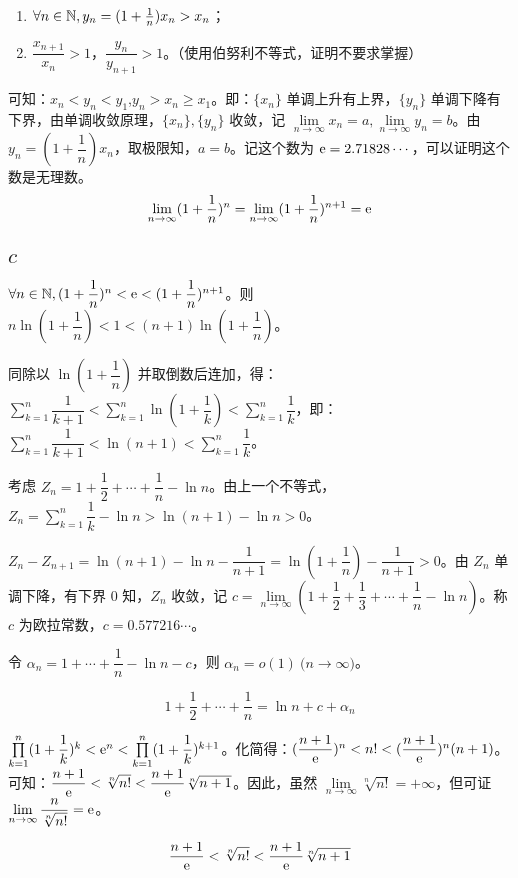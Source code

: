 \begin{enumerate}
	\item $\forall n \in \mathbb N, y_n = (1 + \frac{1}{n}) x_n > x_n$；
	\item $\dfrac{x_{n + 1}}{x_n} > 1$，$\dfrac{y_n}{y_{n + 1}} > 1$。（使用伯努利不等式，证明不要求掌握）
\end{enumerate}

可知：$x_n < y_n < y_1$,$y_n > x_n \ge x_1$。即：$\{x_n\}$ 单调上升有上界，$\{y_n\}$ 单调下降有下界，由单调收敛原理，$\{x_n\}, \{y_n\}$ 收敛，记 $\lim\limits_{n \rightarrow \infty} x_n = a, \lim\limits_{n \rightarrow \infty} y_n = b$。由 $y_n = (1 + \dfrac{1}{n}) x_n$，取极限知，$a = b$。记这个数为 $\mathrm e = 2.71828\cdots$，可以证明这个数是无理数。
$$
\lim_{n \rightarrow \infty} (1 + \dfrac{1}{n})^n = \lim_{n \rightarrow \infty} (1 + \dfrac{1}{n})^{n + 1} = \mathrm e
$$

\subsection{$c$}

$\forall n \in \mathbb N, (1 + \dfrac{1}{n})^n < \mathrm e < (1 + \dfrac{1}{n})^{n + 1}$。则 $n \ln \left( 1 + \dfrac{1}{n} \right) < 1 < (n + 1) \ln \left( 1 + \dfrac{1}{n} \right)$。

同除以 $\ln \left( 1 + \dfrac{1}{n} \right)$ 并取倒数后连加，得：$\sum\limits_{k = 1}^n \dfrac{1}{k + 1} < \sum\limits_{k = 1}^n \ln \left( 1 + \dfrac{1}{k} \right) < \sum\limits_{k = 1}^n \dfrac{1}{k}$，即：$\sum\limits_{k = 1}^n \dfrac{1}{k + 1} < \ln(n + 1) < \sum\limits_{k = 1}^n \dfrac{1}{k}$。

考虑 $Z_n = 1 + \dfrac{1}{2} + \cdots + \dfrac{1}{n} - \ln n$。由上一个不等式，$Z_n = \sum\limits_{k = 1}^n \dfrac{1}{k} - \ln n > \ln(n + 1) - \ln n > 0$。

$Z_n - Z_{n + 1} = \ln(n + 1) - \ln n - \dfrac{1}{n + 1} = \ln(1 + \dfrac{1}{n}) - \dfrac{1}{n + 1} > 0$。由 $Z_n$ 单调下降，有下界 $0$ 知，$Z_n$ 收敛，记 $c = \lim\limits_{n \rightarrow \infty} (1 + \dfrac{1}{2} + \dfrac{1}{3} + \cdots + \dfrac{1}{n} - \ln n)$。称 $c$ 为欧拉常数，$c = 0.577216\cdots$。

令 $\alpha_n = 1 + \cdots + \dfrac{1}{n} - \ln n - c$，则 $\alpha_n = o(1) \pod{n \rightarrow \infty}$。

$$
1 + \dfrac{1}{2} + \cdots + \dfrac{1}{n} = \ln n + c + \alpha_n
$$

$\prod\limits_{k = 1}^n (1 + \dfrac{1}{k})^k < \mathrm e^n < \prod\limits_{k = 1}^n (1 + \dfrac{1}{k})^{k + 1}$。化简得：$(\dfrac{n + 1}{\mathrm e})^n < n! < (\dfrac{n + 1}{\mathrm e})^n (n + 1)$。可知：$\dfrac{n + 1}{\mathrm e} < \sqrt[n]{n!} < \dfrac{n + 1}{\mathrm e} \sqrt[n]{n + 1}$。因此，虽然 $\lim\limits_{n \rightarrow \infty} \sqrt[n]{n!} = +\infty$，但可证 $\lim\limits_{n \rightarrow \infty} \dfrac{n}{\sqrt[n]{n!}} = \mathrm e$。

$$
\dfrac{n + 1}{\mathrm e} < \sqrt[n]{n!} < \dfrac{n + 1}{\mathrm e}\sqrt[n]{n + 1}
$$